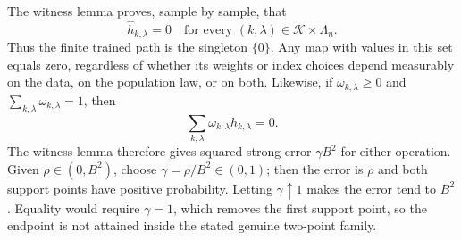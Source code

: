 The witness lemma proves, sample by sample, that
\[
 \widehat h_{k,\lambda}=0
 \quad\text{for every }(k,\lambda)\in\mathcal K\times\Lambda_n.
\]
Thus the finite trained path is the singleton \(\{0\}\). Any map with values in this set equals zero, regardless of whether its weights or index choices depend measurably on the data, on the population law, or on both. Likewise, if \(\omega_{k,\lambda}\ge0\) and \(\sum_{k,\lambda}\omega_{k,\lambda}=1\), then
\[
 \sum_{k,\lambda}\omega_{k,\lambda}\widehat h_{k,\lambda}=0.
\]
The witness lemma therefore gives squared strong error \(\gamma B^2\) for either operation. Given \(\rho\in(0,B^2)\), choose \(\gamma=\rho/B^2\in(0,1)\); then the error is \(\rho\) and both support points have positive probability. Letting \(\gamma\uparrow1\) makes the error tend to \(B^2\). Equality would require \(\gamma=1\), which removes the first support point, so the endpoint is not attained inside the stated genuine two-point family.